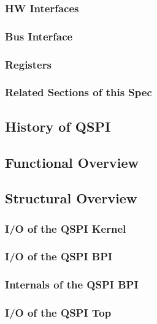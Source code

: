 \subsubsection{HW Interfaces}


\subsubsection{Bus Interface}

\subsubsection{Registers}

\subsubsection{Related Sections of this Spec}

\subsection{History of QSPI}

\subsection{Functional Overview}
\label{subsec:qspifunc01}

\subsection{Structural Overview}



\subsubsection{I/O of the QSPI Kernel}

\subsubsection{I/O of the QSPI BPI}

\subsubsection{Internals of the QSPI BPI}

\subsubsection{I/O of the QSPI Top}

